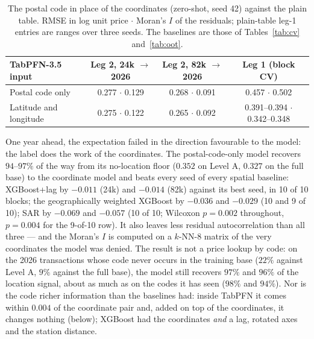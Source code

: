 \documentclass[11pt,a4paper]{article}
\begin{document}
\begin{table}[h]
\centering\small
\caption{The postal code in place of the coordinates (zero-shot, seed 42) against the plain
table. RMSE in log unit price $\cdot$ Moran's $I$ of the residuals; plain-table leg-1 entries
are ranges over three seeds. The baselines are those of Tables~\ref{tab:cv} and~\ref{tab:oot}.}
\label{tab:postal}
\footnotesize
\begin{tabular}{lccc}
\toprule
TabPFN-3.5 input & Leg 2, 24k $\to$ 2026 & Leg 2, 82k $\to$ 2026 & Leg 1 (block CV) \\
\midrule
Postal code only & 0.277 $\cdot$ 0.129 & 0.268 $\cdot$ 0.091 & 0.457 $\cdot$ 0.502 \\
Latitude and longitude & 0.275 $\cdot$ 0.122 & 0.265 $\cdot$ 0.092 & 0.391--0.394 $\cdot$ 0.342--0.348 \\
\bottomrule
\end{tabular}
\end{table}

One year ahead, the expectation failed in the direction favourable to the model: the label does
the work of the coordinates. The postal-code-only model recovers $94$--$97\%$ of the way from
its no-location floor ($0.352$ on Level A, $0.327$ on the full base) to the coordinate model and
beats every seed of every spatial baseline: XGBoost+lag by $-0.011$ (24k) and $-0.014$ (82k)
against its best seed, in 10 of 10 blocks; the geographically weighted XGBoost by $-0.036$ and
$-0.029$ (10 and 9 of 10); SAR by $-0.069$ and $-0.057$ (10 of 10; Wilcoxon $p = 0.002$
throughout, $p = 0.004$ for the 9-of-10 row). It also leaves less residual autocorrelation than
all three --- and the Moran's $I$ is computed on a $k$-NN-8 matrix of the very coordinates the
model was denied. The result is not a price lookup by code: on the 2026 transactions whose code
never occurs in the training base ($22\%$ against Level A, $9\%$ against the full base), the
model still recovers $97\%$ and $96\%$ of the location signal, about as much as on the codes it
has seen ($98\%$ and $94\%$). Nor is the code richer information than the baselines had: inside
TabPFN it comes within $0.004$ of the coordinate pair and, added on top of the coordinates, it
changes nothing (below); XGBoost had the coordinates \emph{and} a lag, rotated axes and the
station distance.
\end{document}
